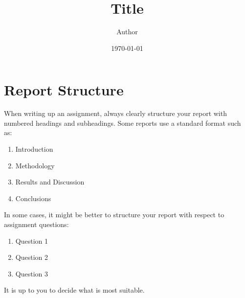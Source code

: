 \documentclass[draft,article]{UsydReport}
\title{Title}
\author{Author}
\date{\today}
\begin{document}
\frontmatter

\newpage
\tableofcontents

\newpage
\mainmatter
% 

\section{Report Structure}
When writing up an assignment, always clearly structure your report with numbered headings and subheadings. Some reports use a standard format such as:
\begin{enumerate}
    \item Introduction
    \item Methodology
    \item Results and Discussion
    \item Conclusions
\end{enumerate}
In some cases, it might be better to structure your report with respect to assignment questions:
\begin{enumerate}
    \item Question 1
    \item Question 2
    \item Question 3
\end{enumerate}
It is up to you to decide what is most suitable.
\end{document}

